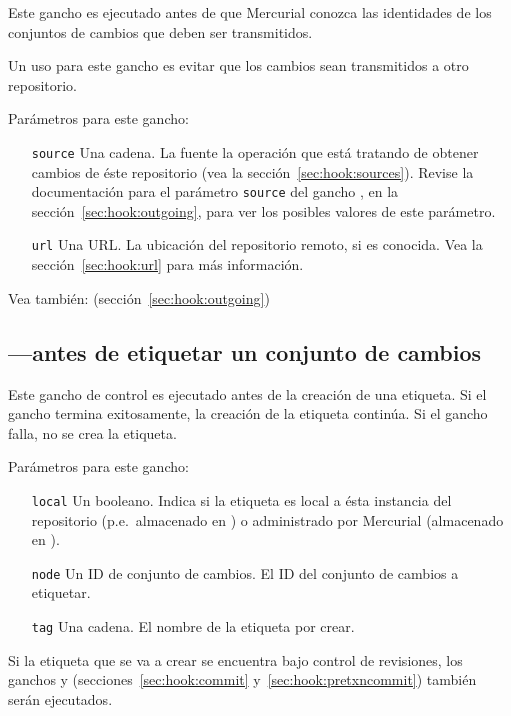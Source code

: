 Este gancho es ejecutado antes de que Mercurial conozca las
identidades de los conjuntos de cambios que deben ser transmitidos.

Un uso para este gancho es evitar que los cambios sean transmitidos a
otro repositorio.

Parámetros para este gancho:
\begin{itemize}
  \item[\texttt{source}] Una cadena. La fuente la operación que está
    tratando de obtener cambios de éste repositorio (vea
    la sección~\ref{sec:hook:sources}).  Revise la documentación para
    el parámetro \texttt{source} del gancho , en la
    sección~\ref{sec:hook:outgoing}, para ver los posibles valores de
    este parámetro.
\item[\texttt{url}] Una URL. La ubicación del repositorio remoto, si
    es conocida. Vea la sección~\ref{sec:hook:url} para más información.
\end{itemize}

Vea también:  (sección~\ref{sec:hook:outgoing})

\subsection{---antes de etiquetar un conjunto de cambios}
\label{sec:hook:pretag}

Este gancho de control es ejecutado antes de la creación de una
etiqueta. Si el gancho termina exitosamente, la creación de la
etiqueta continúa. Si el gancho falla, no se crea la etiqueta.

Parámetros para este gancho:
\begin{itemize}
\item[\texttt{local}] Un booleano. Indica si la etiqueta es local a
  ésta instancia del repositorio (p.e.~almacenado en
  ) o administrado por Mercurial (almacenado
  en ).
\item[\texttt{node}] Un ID de conjunto de cambios. El ID del conjunto
  de cambios a etiquetar.
\item[\texttt{tag}] Una cadena. El nombre de la etiqueta por crear.
\end{itemize}

Si la etiqueta que se va a crear se encuentra bajo control de
revisiones, los ganchos  y 
(secciones~\ref{sec:hook:commit} y~\ref{sec:hook:pretxncommit})
también serán ejecutados.

